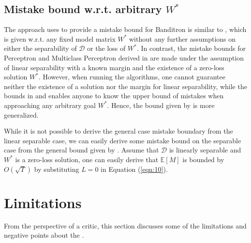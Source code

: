 \documentclass{article}
\begin{document}
\subsection{Mistake bound w.r.t. arbitrary $W^*$}\label{sec:2.2}
The approach \citet{kakade2008efficient} uses to provide a mistake bound for Banditron is similar to \citet{fink2006online}, which is given w.r.t. any fixed model matrix $W^*$ without any further assumptions on either the separability of $\mathcal{D}$ or the loss of $W^*$. In contrast, the mistake bounds for Perceptron and Multiclass Perceptron derived in \citet{rosenblatt1958perceptron,crammer2003ultraconservative} are made under the assumption of linear separability with a known margin and the existence of a zero-loss solution $W^*$. However, when running the algorithms, one cannot guarantee neither the existence of a solution nor the margin for linear separability, while the bounds in \citet{kakade2008efficient} and \citet{fink2006online} enables anyone to know the upper bound of mistakes when approaching any arbitrary goal $W^*$. Hence, the bound given by \citet{kakade2008efficient} is more generalized.

While it is not possible to derive the general case mistake boundary from the linear separable case, we can easily derive some mistake bound on the separable case from the general bound given by \citet{kakade2008efficient}. Assume that $\mathcal{D}$ is linearly separable and $W^*$ is a zero-loss solution, one can easily derive that $\mathbb{E}[M]$ is bounded by $O(\sqrt{T})$ by substituting $L=0$ in Equation (\ref{eqn:10}).

\section{Limitations}\label{sec:negative}
\vspace{-.05in}
From the perspective of a critic, this section discusses some of the limitations and negative points about the \citet{kakade2008efficient}.
\end{document}
